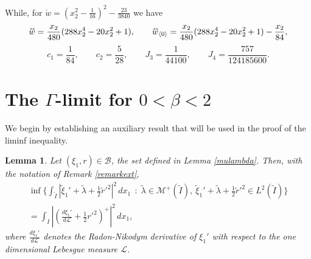 \documentclass[a4, 11pt, reqno, final]{amsart}
\newcommand{\calB}{\mathcal{B}}
\newcommand{\calL}{\mathcal{L}}
\newcommand{\calM}{\mathcal{M}}
\newcommand\ringring[1]{%
	{%
		\mathop{\kern0pt #1}\limits^{%
			\vbox to-1.85ex{
				\kern-2ex %
				\hbox to 0pt{\hss\normalfont\kern.1em \r{}\kern-.45em \r{}\hss}%
				\vss %
			}%
		}%
	}%
}
\theoremstyle{plain}%
\newtheorem{lemma}[theorem]{Lemma}
\DeclareMathOperator{\st}{\,:\,}
\begin{document}
	While, for $\mathring{w} = (x_2^2 - \frac{1}{16})^2 - \frac{23}{3840}$ we have
	$$ \ringring{w} = \frac{x_2}{480}(288x_2^4 - 20x_2^2 + 1)
	, \qquad \ringring{w}_{\langle 0 \rangle} = \frac{x_2}{480}(288x_2^4 - 20x_2^2 + 1) - \frac{x_2}{84},
	$$
	$$ c_1 = \frac{1}{84}, \qquad c_2 = \frac{5}{28}, \qquad J_3 = \frac{1}{44100}, \qquad J_4 = \frac{757
	}{124185600}.$$


	\section{The $\Gamma$-limit for $0<\beta<2$}\label{sec:gamma1}

	We begin by establishing an auxiliary result that will be used in the proof of the liminf inequality.

	\begin{lemma}\label{lemmarelax}
		Let $(\xi_1,r) \in \calB$, the set defined in Lemma \ref{mulambda}. Then, with the notation of Remark \ref{remarkext},
		\begin{multline}\inf\{\int_{\widetilde{I}} |\widetilde{\xi}_1' + \widetilde{\lambda} + \frac12 \widetilde{r}'^2|^2 \, dx_1 \st  \widetilde{\lambda} \in \calM^+(\widetilde{I}), \ \widetilde{\xi}_1' + \widetilde{\lambda} + \frac12 \widetilde{r}'^2 \in L^2(\widetilde{I})\} \\ = \int_I |(\frac{d\xi_1'}{d\calL}  + \frac12 r'^2)^+|^2 \, dx_1,\end{multline}
		where $\frac{d\xi_1'}{d\calL}$ denotes the Radon-Nikodym derivative of $\xi_1'$ with respect to  the one dimensional Lebesgue measure $\calL$.
	\end{lemma}
\end{document}
